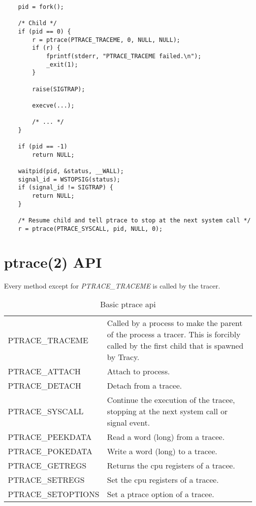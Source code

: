\documentclass[a4paper, 10pt]{report}
\begin{document}
\begin{lstlisting}
    pid = fork();

    /* Child */
    if (pid == 0) {
        r = ptrace(PTRACE_TRACEME, 0, NULL, NULL);
        if (r) {
            fprintf(stderr, "PTRACE_TRACEME failed.\n");
            _exit(1);
        }

        raise(SIGTRAP);

        execve(...);

        /* ... */
    }

    if (pid == -1)
        return NULL;

    waitpid(pid, &status, __WALL);
    signal_id = WSTOPSIG(status);
    if (signal_id != SIGTRAP) {
        return NULL;
    }

    /* Resume child and tell ptrace to stop at the next system call */
    r = ptrace(PTRACE_SYSCALL, pid, NULL, 0);
\end{lstlisting}

\chapter{ptrace(2) API}
\label{ptrace-api}

Every method except for \textit{PTRACE\_TRACEME} is called by the tracer.
\begin{table}[h!]
    \centering
    \begin{tabular}{|l|p{8cm}|}
    \hline
        PTRACE\_TRACEME & Called by a process to make the parent of the process
        a tracer. This is forcibly called by the first child that is
        spawned by Tracy. \\
        PTRACE\_ATTACH & Attach to process. \\
        PTRACE\_DETACH & Detach from a tracee. \\
        PTRACE\_SYSCALL & Continue the execution of the tracee,
        stopping at the next system call or signal event. \\
        PTRACE\_PEEKDATA & Read a word (long) from a tracee. \\
        PTRACE\_POKEDATA & Write a word (long) to a tracee. \\
        PTRACE\_GETREGS & Returns the cpu registers of a tracee. \\
        PTRACE\_SETREGS & Set the cpu registers of a tracee. \\
        PTRACE\_SETOPTIONS & Set a ptrace option of a tracee. \\
    \hline
    \end{tabular}
    \caption{Basic ptrace api}
    \label{tab:ptrace-api}
\end{table}
\end{document}
